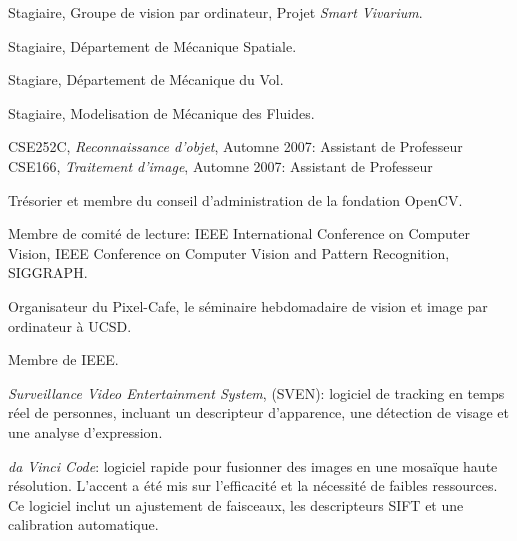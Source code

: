\begin{llist}
Stagiaire, Groupe de vision par ordinateur, Projet {\em Smart Vivarium}.

Stagiaire, D\'{e}partement de M\'{e}canique Spatiale.

 
Stagiare, D\'{e}partement de M\'{e}canique du Vol.

 
Stagiaire, Modelisation de M\'{e}canique des Fluides.

CSE252C, {\em Reconnaissance d'objet}, Automne 2007: Assistant de Professeur\\
CSE166, {\em Traitement d'image}, Automne 2007: Assistant de Professeur


Tr\'{e}sorier et membre du conseil d'administration de la fondation OpenCV.

Membre de comit\'{e} de lecture: IEEE International Conference on Computer Vision, IEEE Conference on Computer Vision and Pattern Recognition, SIGGRAPH.

Organisateur du Pixel-Cafe, le s\'{e}minaire hebdomadaire de vision et image par ordinateur \`{a} UCSD.

Membre de IEEE.





{\em Surveillance Video Entertainment System}, (SVEN): logiciel de tracking en temps r\'eel de personnes, incluant un descripteur d'apparence, une d\'{e}tection de visage et une analyse d'expression.

{\em da Vinci Code}: logiciel rapide pour fusionner des images en une mosa\"{i}que haute r\'{e}solution.  L'accent a \'{e}t\'{e} mis sur l'efficacit\'{e} et la n\'{e}cessit\'{e} de faibles ressources.  Ce logiciel inclut un ajustement de faisceaux, les descripteurs SIFT et une calibration automatique.


\end{llist}
